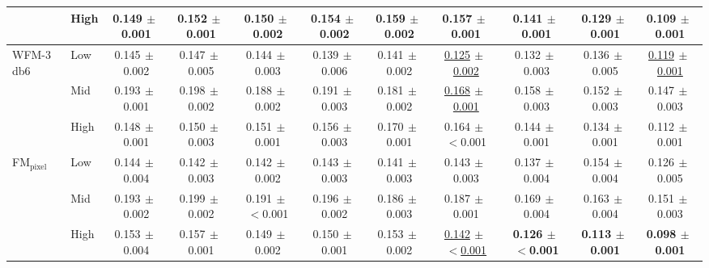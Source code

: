 \begin{table}[ht]
{\begin{tabular}{llccccccccc}
 & High & 0.149{\scriptsize$\,\pm\,$0.001} & 0.152{\scriptsize$\,\pm\,$0.001} & 0.150{\scriptsize$\,\pm\,$0.002} & 0.154{\scriptsize$\,\pm\,$0.002} & 0.159{\scriptsize$\,\pm\,$0.002} & 0.157{\scriptsize$\,\pm\,$0.001} & 0.141{\scriptsize$\,\pm\,$0.001} & 0.129{\scriptsize$\,\pm\,$0.001} & 0.109{\scriptsize$\,\pm\,$0.001} \\
\midrule
\multirow{3}{*}{WFM-3 db6} & Low & 0.145{\scriptsize$\,\pm\,$0.002} & 0.147{\scriptsize$\,\pm\,$0.005} & 0.144{\scriptsize$\,\pm\,$0.003} & 0.139{\scriptsize$\,\pm\,$0.006} & 0.141{\scriptsize$\,\pm\,$0.002} & \underline{0.125{\scriptsize$\,\pm\,$0.002}} & 0.132{\scriptsize$\,\pm\,$0.003} & 0.136{\scriptsize$\,\pm\,$0.005} & \underline{0.119{\scriptsize$\,\pm\,$0.001}} \\
 & Mid & 0.193{\scriptsize$\,\pm\,$0.001} & 0.198{\scriptsize$\,\pm\,$0.002} & 0.188{\scriptsize$\,\pm\,$0.002} & 0.191{\scriptsize$\,\pm\,$0.003} & 0.181{\scriptsize$\,\pm\,$0.002} & \underline{0.168{\scriptsize$\,\pm\,$0.001}} & 0.158{\scriptsize$\,\pm\,$0.003} & 0.152{\scriptsize$\,\pm\,$0.003} & 0.147{\scriptsize$\,\pm\,$0.003} \\
 & High & 0.148{\scriptsize$\,\pm\,$0.001} & 0.150{\scriptsize$\,\pm\,$0.003} & 0.151{\scriptsize$\,\pm\,$0.001} & 0.156{\scriptsize$\,\pm\,$0.003} & 0.170{\scriptsize$\,\pm\,$0.001} & 0.164{\scriptsize$\,\pm\,$$<$0.001} & 0.144{\scriptsize$\,\pm\,$0.001} & 0.134{\scriptsize$\,\pm\,$0.001} & 0.112{\scriptsize$\,\pm\,$0.001} \\
\midrule
\multirow{3}{*}{FM$_\text{pixel}$} & Low & 0.144{\scriptsize$\,\pm\,$0.004} & 0.142{\scriptsize$\,\pm\,$0.003} & 0.142{\scriptsize$\,\pm\,$0.002} & 0.143{\scriptsize$\,\pm\,$0.003} & 0.141{\scriptsize$\,\pm\,$0.003} & 0.143{\scriptsize$\,\pm\,$0.003} & 0.137{\scriptsize$\,\pm\,$0.004} & 0.154{\scriptsize$\,\pm\,$0.004} & 0.126{\scriptsize$\,\pm\,$0.005} \\
 & Mid & 0.193{\scriptsize$\,\pm\,$0.002} & 0.199{\scriptsize$\,\pm\,$0.002} & 0.191{\scriptsize$\,\pm\,$$<$0.001} & 0.196{\scriptsize$\,\pm\,$0.002} & 0.186{\scriptsize$\,\pm\,$0.003} & 0.187{\scriptsize$\,\pm\,$0.001} & 0.169{\scriptsize$\,\pm\,$0.004} & 0.163{\scriptsize$\,\pm\,$0.004} & 0.151{\scriptsize$\,\pm\,$0.003} \\
 & High & 0.153{\scriptsize$\,\pm\,$0.004} & 0.157{\scriptsize$\,\pm\,$0.001} & 0.149{\scriptsize$\,\pm\,$0.002} & 0.150{\scriptsize$\,\pm\,$0.001} & 0.153{\scriptsize$\,\pm\,$0.002} & \underline{0.142{\scriptsize$\,\pm\,$$<$0.001}} & \textbf{0.126{\scriptsize$\,\pm\,$$<$0.001}} & \textbf{0.113{\scriptsize$\,\pm\,$0.001}} & \textbf{0.098{\scriptsize$\,\pm\,$0.001}} \\

\end{tabular}}
\end{table}
